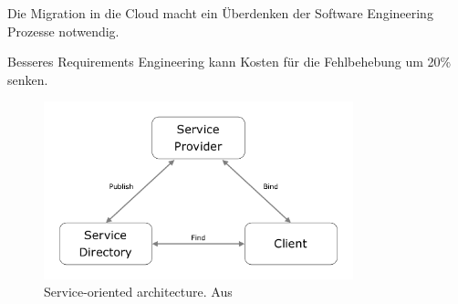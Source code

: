 Die Migration in die Cloud macht ein Überdenken der Software Engineering 
Prozesse notwendig. 

Besseres Requirements Engineering kann Kosten für die Fehlbehebung um 20\% 
senken.

\begin{figure}[!h]
\begin{center}
\includegraphics[width=0.8\textwidth]{images/soa_architecture.png}
\caption{Service-oriented architecture. Aus 
\protect{}}
\label{fig:soa_architecture}
\end{center}
\end{figure}


